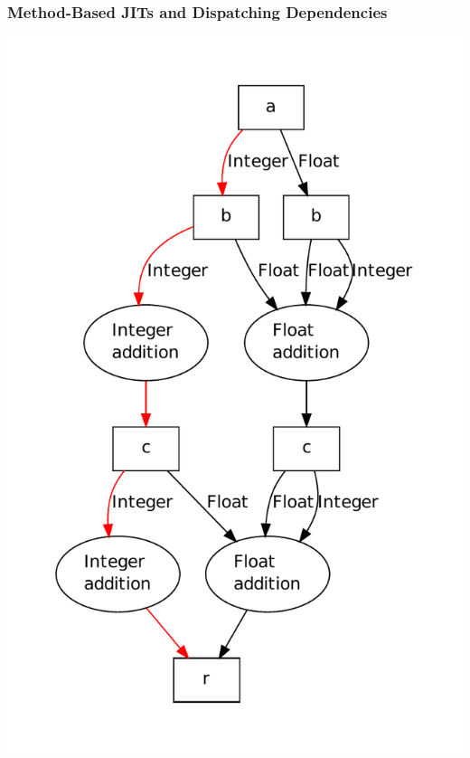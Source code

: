 \documentclass[utf8x]{beamer}
\begin{document}
\begin{frame}
  \frametitle{Method-Based JITs and Dispatching Dependencies}
  \includegraphics[scale=0.41]{figures/add_fast.pdf}
\end{frame}
\end{document}
